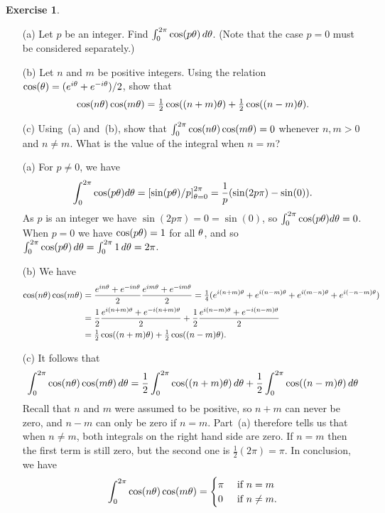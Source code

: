\documentclass[a4paper]{amsart}
\theoremstyle{definition}
\newtheorem{exercise}{Exercise}[section]
\newenvironment{solution}{{\noindent \bf Solution:}}{}
\begin{document}
\begin{exercise}\label{ex-cos-orth}
\begin{itemize}
  \item[(a)] Let $p$ be an integer.  Find
   $\int_0^{2\pi}\cos(p\theta)\,d\theta$.  (Note that the case $p=0$
   must be considered separately.)
  \item[(b)] Let $n$ and $m$ be positive integers.  Using the
   relation $\cos(\theta)=(e^{i\theta}+e^{-i\theta})/2$, show that 
   \[ \cos(n\theta)\cos(m\theta) = 
     \tfrac{1}{2}\cos((n+m)\theta) + \tfrac{1}{2}\cos((n-m)\theta).
   \]
  \item[(c)] Using~(a) and~(b), show that
   $\int_0^{2\pi}\cos(n\theta)\cos(m\theta)=0$ whenever $n,m>0$ and
   $n\neq m$.  What is the value of the integral when $n=m$?
 \end{itemize}
\end{exercise}
\begin{solution}
\begin{itemize}
  \item[(a)] For $p\neq 0$, we have 
   \[ \int_0^{2\pi}\cos(p\theta)d\theta =  
      \left[\sin(p\theta)/p\right]_{\theta=0}^{2\pi} = 
      \frac{1}{p}(\sin(2p\pi) - \sin(0)).
   \]
   As $p$ is an integer we have $\sin(2p\pi)=0=\sin(0)$, so 
   $\int_0^{2\pi}\cos(p\theta)d\theta=0$.  When $p=0$ we have
   $\cos(p\theta)=1$ for all $\theta$, and so 
   $\int_0^{2\pi}\cos(p\theta)\,d\theta=\int_0^{2\pi}1\,d\theta=2\pi$.
  \item[(b)] We have
   \begin{align*}
    \cos(n\theta)\cos(m\theta) 
     &= \frac{e^{in\theta}+e^{-in\theta}}{2}
        \frac{e^{im\theta}+e^{-im\theta}}{2}
      = \tfrac{1}{4}(
         e^{i(n+m)\theta} + e^{i(n-m)\theta} +
         e^{i(m-n)\theta} + e^{i(-n-m)\theta}
        ) \\
     &= \frac{1}{2} \frac{e^{i(n+m)\theta} + e^{-i(n+m)\theta}}{2} +
        \frac{1}{2} \frac{e^{i(n-m)\theta} + e^{-i(n-m)\theta}}{2} \\
     &= \tfrac{1}{2}\cos((n+m)\theta) + \tfrac{1}{2}\cos((n-m)\theta).
   \end{align*}
  \item[(c)] It follows that 
   \[ \int_0^{2\pi} \cos(n\theta)\cos(m\theta)\,d\theta = 
       \frac{1}{2}\int_0^{2\pi}\cos((n+m)\theta)\,d\theta + 
       \frac{1}{2}\int_0^{2\pi}\cos((n-m)\theta)\,d\theta
   \]
   Recall that $n$ and $m$ were assumed to be positive, so $n+m$
   can never be zero, and $n-m$ can only be zero if $n=m$. 
   Part~(a) therefore tells us that when $n\neq m$, both integrals
   on the right hand side are zero.  If $n=m$ then the first term
   is still zero, but the second one is $\frac{1}{2}(2\pi)=\pi$.
   In conclusion, we have
   \[ \int_0^{2\pi}\cos(n\theta)\cos(m\theta) = 
       \begin{cases}
        \pi & \text{ if } n=m \\
        0   & \text{ if } n\neq m.
       \end{cases}
   \]
 \end{itemize}
\end{solution}
\end{document}
